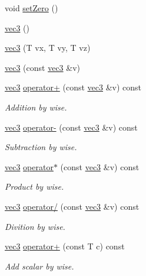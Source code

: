 \begin{DoxyCompactItemize}
void \mbox{\hyperlink{struct_space_h_1_1vec3_ad2e7b91b843f84633372857718f1b5ba}{set\+Zero}} ()
\item 
\mbox{\hyperlink{struct_space_h_1_1vec3_adaeadb1aa964e9f603d2d2402bc0e29a}{vec3}} ()
\item 
\mbox{\hyperlink{struct_space_h_1_1vec3_a9441fda82b87e8b91167dc6e5e3039a2}{vec3}} (T vx, T vy, T vz)
\item 
\mbox{\hyperlink{struct_space_h_1_1vec3_ae3f72473af782f642108ed5c87263657}{vec3}} (const \mbox{\hyperlink{struct_space_h_1_1vec3}{vec3}} \&v)
\item 
\mbox{\hyperlink{struct_space_h_1_1vec3}{vec3}} \mbox{\hyperlink{struct_space_h_1_1vec3_a439dd37afaf3c046cd58b370b9d70b80}{operator+}} (const \mbox{\hyperlink{struct_space_h_1_1vec3}{vec3}} \&v) const
\begin{DoxyCompactList}\small\item\em Addition by wise. \end{DoxyCompactList}\item 
\mbox{\hyperlink{struct_space_h_1_1vec3}{vec3}} \mbox{\hyperlink{struct_space_h_1_1vec3_a8af5f368ccbf70d24d528592acfc6278}{operator-\/}} (const \mbox{\hyperlink{struct_space_h_1_1vec3}{vec3}} \&v) const
\begin{DoxyCompactList}\small\item\em Subtraction by wise. \end{DoxyCompactList}\item 
\mbox{\hyperlink{struct_space_h_1_1vec3}{vec3}} \mbox{\hyperlink{struct_space_h_1_1vec3_a5399298171d5e12e7b76ade00ab7d67d}{operator$\ast$}} (const \mbox{\hyperlink{struct_space_h_1_1vec3}{vec3}} \&v) const
\begin{DoxyCompactList}\small\item\em Product by wise. \end{DoxyCompactList}\item 
\mbox{\hyperlink{struct_space_h_1_1vec3}{vec3}} \mbox{\hyperlink{struct_space_h_1_1vec3_ab9d46a10bb578ff6939ed9280cb12df8}{operator/}} (const \mbox{\hyperlink{struct_space_h_1_1vec3}{vec3}} \&v) const
\begin{DoxyCompactList}\small\item\em Divition by wise. \end{DoxyCompactList}\item 
\mbox{\hyperlink{struct_space_h_1_1vec3}{vec3}} \mbox{\hyperlink{struct_space_h_1_1vec3_a9271a40ff2a3d64a97f37e53fb668d07}{operator+}} (const T c) const
\begin{DoxyCompactList}\small\item\em Add scalar by wise. \end{DoxyCompactList}\item 

\end{DoxyCompactItemize}
